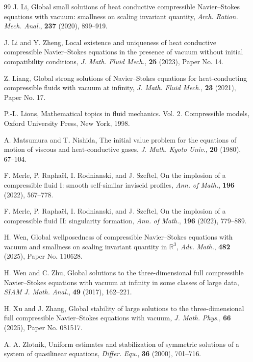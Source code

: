 \documentclass[11pt]{article}
\begin{document}
\begin{thebibliography}{99}
 J. Li,
Global small solutions of heat conductive compressible Navier--Stokes equations with vacuum: smallness on scaling invariant quantity,
{\it Arch. Ration. Mech. Anal.}, {\bf 237} (2020), 899--919.

 J. Li and Y. Zheng,
Local existence and uniqueness of heat conductive compressible Navier--Stokes equations in the presence of vacuum without initial compatibility conditions,
{\it J. Math. Fluid Mech.}, {\bf 25} (2023), Paper No. 14.

 Z. Liang,
Global strong solutions of Navier--Stokes equations for heat-conducting compressible fluids with vacuum at infinity,
{\it J. Math. Fluid Mech.}, {\bf 23} (2021), Paper No. 17.

 P.-L. Lions,
Mathematical topics in fluid mechanics. Vol. 2. Compressible models,
Oxford University Press, New York, 1998.

 A. Matsumura and T. Nishida,
The initial value problem for the equations of motion of viscous and heat-conductive gases, {\it J. Math. Kyoto Univ.}, {\bf 20} (1980), 67--104.

F. Merle, P. Rapha\"el, I. Rodnianski, and J. Szeftel, On the implosion of a compressible fluid I: smooth self-similar inviscid profiles,
{\it Ann. of Math.}, {\bf 196} (2022), 567--778.

F. Merle, P. Rapha\"el, I. Rodnianski, and J. Szeftel, On the implosion of a compressible fluid II: singularity formation, {\it Ann. of Math.}, {\bf 196} (2022), 779--889.

 H. Wen,
Global wellposedness of compressible Navier--Stokes equations with vacuum and smallness on scaling invariant quantity in $\mathbb{R}^3$,
{\it Adv. Math.}, {\bf 482} (2025), Paper No. 110628.

 H. Wen and C. Zhu,
Global solutions to the three-dimensional full compressible Navier--Stokes equations with vacuum at infinity in some classes of large data,
{\it SIAM J. Math. Anal.}, {\bf 49} (2017), 162--221.

 H. Xu and J. Zhang,
Global stability of large solutions to the three-dimensional full compressible Navier--Stokes equations with vacuum,
{\it J. Math. Phys.}, {\bf 66} (2025), Paper No. 081517.

 A. A. Zlotnik,
Uniform estimates and stabilization of symmetric solutions of a system of quasilinear equations,
{\it Differ. Equ.}, {\bf 36} (2000), 701--716.

\end{thebibliography}
\end{document}
